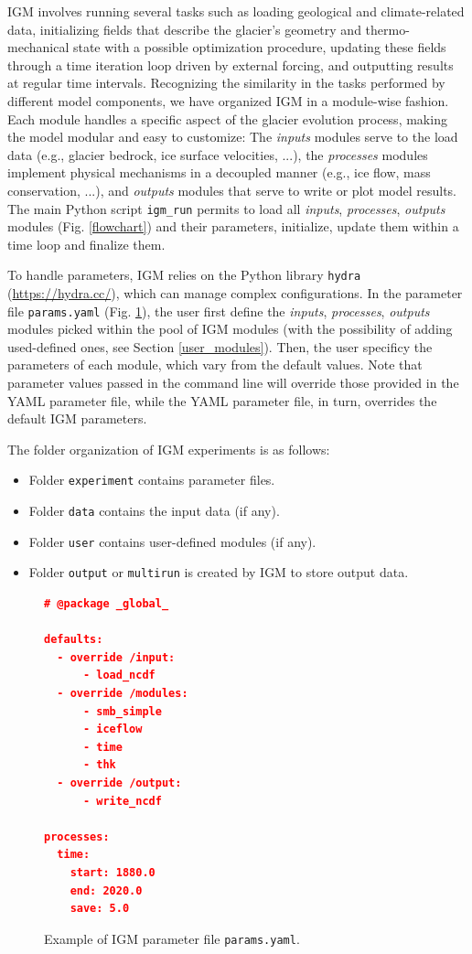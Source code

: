\documentclass[gmd]{copernicus}
\begin{document}
IGM involves running several tasks such as loading geological and climate-related data, initializing fields that describe the glacier's geometry and thermo-mechanical state with a possible optimization procedure, updating these fields through a time iteration loop driven by external forcing, and outputting results at regular time intervals. Recognizing the similarity in the tasks performed by different model components, we have organized IGM in a module-wise fashion. Each module handles a specific aspect of the glacier evolution process, making the model modular and easy to customize: The \textit{inputs} modules serve to the load data (e.g., glacier bedrock, ice surface velocities, ...), the \textit{processes} modules implement physical mechanisms in a decoupled manner (e.g., ice flow, mass conservation, ...), and \textit{outputs} modules that serve to write or plot model results. The main Python script \texttt{igm\_run} permits to load all \textit{inputs}, \textit{processes}, \textit{outputs} modules (Fig. \ref{flowchart}) and their parameters, initialize, update them within a time loop and finalize them. 

To handle parameters, IGM relies on the Python library \texttt{hydra} (\url{https://hydra.cc/}), which can manage complex configurations. In the parameter file \texttt{params.yaml} (Fig. \ref{ex_yaml}), the user first define the \textit{inputs}, \textit{processes}, \textit{outputs} modules picked within the pool of IGM modules (with the possibility of adding used-defined ones, see Section \ref{user_modules}). Then, the user specificy the parameters of each module, which vary from the default values. Note that parameter values passed in the command line will override those provided in the YAML parameter file, while the YAML parameter file, in turn, overrides the default IGM parameters. 

The folder organization of IGM experiments is as follows:
\begin{itemize}
  \item Folder \texttt{experiment} contains parameter files.
  \item Folder \texttt{data} contains the input data (if any).
  \item Folder \texttt{user} contains user-defined modules (if any).
  \item Folder \texttt{output} or \texttt{multirun} is created by IGM to store output data.
\end{itemize}
 
\begin{figure}[!h]  
\begin{lstlisting}[language=json,numbers=none,framexleftmargin=0pt]
# @package _global_
 
defaults:
  - override /input: 
      - load_ncdf
  - override /modules: 
      - smb_simple
      - iceflow
      - time
      - thk
  - override /output: 
      - write_ncdf

processes: 
  time:
    start: 1880.0
    end: 2020.0
    save: 5.0
\end{lstlisting}
\caption{Example of IGM parameter file \texttt{params.yaml}. \label{ex_yaml}}
\end{figure}
\end{document}

